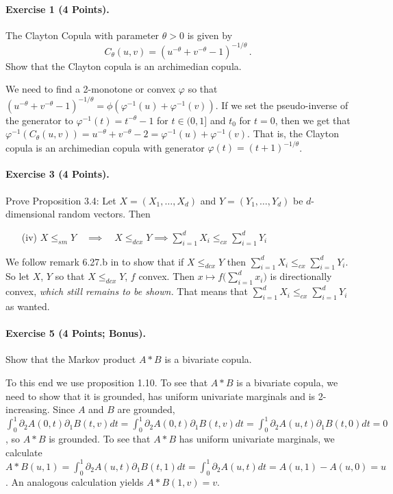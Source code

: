 \documentclass{article}
\begin{document}
\paragraph{Exercise 1 \textnormal{(4 Points)}.}
The Clayton Copula with parameter $\theta>0$ is given by
\[
C_\theta(u,v)=(u^{-\theta}+v^{-\theta}-1)^{-1/\theta}\,.
\]
Show that the Clayton copula is an archimedian copula.

We need to find a 2-monotone or convex $\varphi$ so that $(u^{-\theta}+v^{-\theta}-1)^{-1/\theta}=\phi(\varphi^{-1}(u)+\varphi^{-1}(v))$.
If we set the pseudo-inverse of the generator to $\varphi^{-1}(t)=t^{-\theta}-1$ for $t\in(0,1]$ and $t_0$ for $t=0$, then we get that $\varphi^{-1}(C_\theta(u,v))=u^{-\theta}+v^{-\theta}-2=\varphi^{-1}(u)+\varphi^{-1}(v)$.
That is, the Clayton copula is an archimedian copula with generator $\varphi(t)=(t+1)^{-1/\theta}$.
\pagebreak
\paragraph{Exercise 3 \textnormal{(4 Points)}.}
Prove Proposition 3.4:
Let $X=(X_1,\dots,X_d)$ and $Y=(Y_1,\dots,Y_d)$ be $d$-dimensional random vectors.
Then

\begin{itemize}
\item [(iv)] $X\leq_{sm}Y\quad\implies\quad X\leq_{dcx}Y\implies\sum_{i=1}^dX_i\leq_{cx}\sum_{i=1}^dY_i$
\end{itemize}
We follow remark 6.27.b in \cite{ruschendorf2013mathematical} to show that if $X\leq_{dcx}Y$ then $\sum_{i=1}^dX_i\leq_{cx}\sum_{i=1}^dY_i$.
So let $X$, $Y$ so that $X\leq_{dcx}Y$, $f$ convex.
Then $x\mapsto f\bigl(\sum_{i=1}^dx_i\bigr)$ is directionally convex, \emph{which still remains to be shown.}
That means that $\sum_{i=1}^dX_i\leq_{cx}\sum_{i=1}^dY_i$ as wanted.
\pagebreak
\paragraph{Exercise 5 \textnormal{(4 Points; Bonus)}.} Show that the Markov product $A*B$ is a bivariate copula.

To this end we use proposition 1.10.
To see that $A*B$ is a bivariate copula, we need to show that it is grounded, has uniform univariate marginals and is 2-increasing.
Since $A$ and $B$ are grounded, $\int_0^1\partial_2A(0,t)\partial_1B(t,v)dt=\int_0^1\partial_2A(0,t)\partial_1B(t,v)dt=\int_0^1\partial_2A(u,t)\partial_1B(t,0)dt=0$, so $A*B$ is grounded.
To see that $A*B$ has uniform univariate marginals, we calculate $A*B(u,1)=\int_0^1\partial_2A(u,t)\partial_1B(t,1)dt=\int_0^1\partial_2A(u,t)dt=A(u,1)-A(u,0)=u$.
An analogous calculation yields ${A*B}(1,v)=v$.
\end{document}
